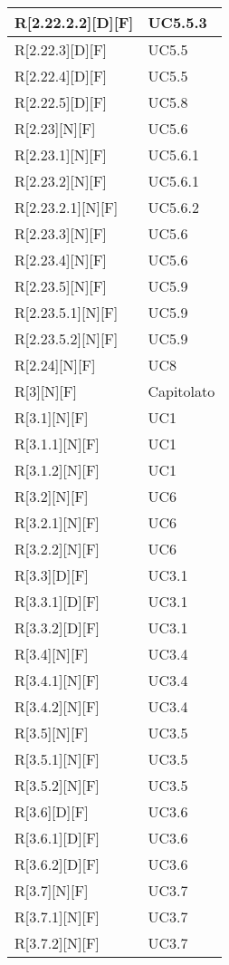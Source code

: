 \begin{longtable}{X | X}
\hline
R[2.22.2.2][D][F] & UC5.5.3 \\
\hline
R[2.22.3][D][F] & UC5.5 \\
\hline
R[2.22.4][D][F] & UC5.5 \\
\hline
R[2.22.5][D][F] & UC5.8 \\
\hline
R[2.23][N][F] & UC5.6 \\
\hline
R[2.23.1][N][F] & UC5.6.1 \\
\hline
R[2.23.2][N][F] & UC5.6.1 \\
\hline
R[2.23.2.1][N][F] & UC5.6.2 \\
\hline
R[2.23.3][N][F] & UC5.6 \\
\hline
R[2.23.4][N][F] & UC5.6 \\
\hline
R[2.23.5][N][F] & UC5.9 \\
\hline
R[2.23.5.1][N][F] & UC5.9 \\
\hline
R[2.23.5.2][N][F] & UC5.9 \\
\hline
R[2.24][N][F] & UC8 \\
\hline
R[3][N][F] & Capitolato \\
\hline
R[3.1][N][F] & UC1 \\
\hline
R[3.1.1][N][F] & UC1 \\
\hline
R[3.1.2][N][F] & UC1 \\
\hline
R[3.2][N][F] & UC6 \\
\hline
R[3.2.1][N][F] & UC6 \\
\hline
R[3.2.2][N][F] & UC6 \\
\hline
R[3.3][D][F] & UC3.1 \\
\hline
R[3.3.1][D][F] & UC3.1 \\
\hline
R[3.3.2][D][F] & UC3.1 \\
\hline
R[3.4][N][F] & UC3.4 \\
\hline
R[3.4.1][N][F] & UC3.4 \\
\hline
R[3.4.2][N][F] & UC3.4 \\
\hline
R[3.5][N][F] & UC3.5 \\
\hline
R[3.5.1][N][F] & UC3.5 \\
\hline
R[3.5.2][N][F] & UC3.5 \\
\hline
R[3.6][D][F] & UC3.6 \\
\hline
R[3.6.1][D][F] & UC3.6 \\
\hline
R[3.6.2][D][F] & UC3.6 \\
\hline
R[3.7][N][F] & UC3.7 \\
\hline
R[3.7.1][N][F] & UC3.7 \\
\hline
R[3.7.2][N][F] & UC3.7 \\

\end{longtable}
